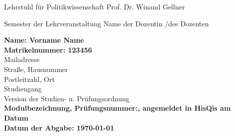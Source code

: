 \begin{titlepage}

        {Lehrstuhl für Politikwissenschaft}
        {Prof. Dr. Winand Gellner}

    \vspace{4cm}

        {Semester der Lehrveranstaltung}
        {Name der Dozentin /des Dozenten}

    \titel{\thetitle}

    \vspace*{\fill}

    \begin{flushleft}
        \textbf{Name: Vorname Name}\\
        \textbf{Matrikelnummer: 123456}\\[0.5cm]
        Mailadresse\\
        Straße, Hausnummer\\
        Postleitzahl, Ort\\[0.5cm]
        Studiengang\\
        Version der Studien- u. Prüfungsordnung\\[2cm]
        \textbf{Modulbezeichnung, Prüfungsnummer:, angemeldet in HisQis am Datum}\\
        \textbf{Datum der Abgabe: \today}
    \end{flushleft}

\end{titlepage}